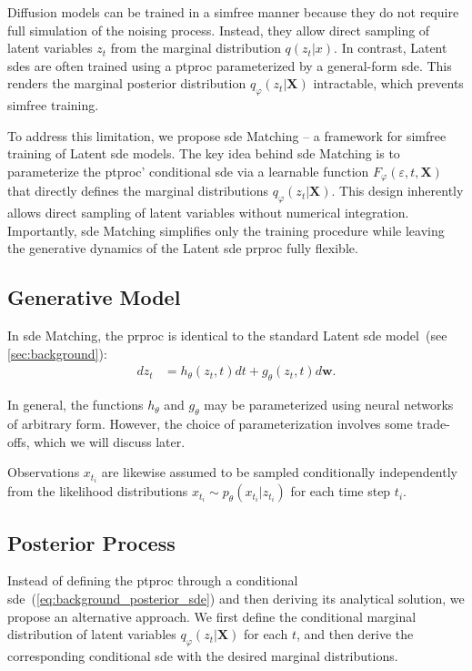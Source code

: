 \documentclass{article}
\def\X{\mathbf{X}}
\def\w{\mathbf{w}}
\def\e{\varepsilon}
\def\ph{\varphi}
\def\th{\theta}
\theoremstyle{plain}
\theoremstyle{definition}
\theoremstyle{remark}
\begin{document}
Diffusion models can be trained in a \gls{simfree} manner because they do not require full simulation of the noising process. Instead, they allow direct sampling of latent variables $z_t$ from the marginal distribution $q(z_t|x)$. In contrast, Latent \glspl{sde} are often trained using a  \gls{ptproc} parameterized by a general-form \gls{sde}. This renders the marginal posterior distribution $q_\ph(z_t|\X)$ intractable, which prevents \gls{simfree} training.


To address this limitation, we propose \gls{sde} Matching -- a framework for \gls{simfree} training of Latent \gls{sde} models. The key idea behind \gls{sde} Matching is to parameterize the \gls{ptproc}' conditional \gls{sde} via a learnable function $F_\ph(\e, t, \X)$ that directly defines the marginal distributions $q_\ph(z_t|\X)$. This design inherently allows direct sampling of latent variables without numerical integration. Importantly, \gls{sde} Matching simplifies only the training procedure while leaving the generative dynamics of the Latent \gls{sde} \gls{prproc} fully flexible. 


\subsection{Generative Model}


In \gls{sde} Matching, the \gls{prproc} is identical to the standard Latent \gls{sde} model~(see \cref{sec:background}):
\begin{align}
    d z_t &= h_\th(z_t, t) d t + g_\th(z_t, t) d \w.
    \label{eq:prior_sde}
\end{align}


In general, the functions $h_\th$ and $g_\th$ may be parameterized using neural networks of arbitrary form. However, the choice of parameterization involves some trade-offs, which we will discuss later.

Observations $x_{t_i}$ are likewise assumed to be sampled conditionally independently from the likelihood distributions ${x_{t_i} \sim p_\th(x_{t_i}|z_{t_i})}$ for each time step $t_i$.

\subsection{Posterior Process}
\label{sec:posterior_process}


Instead of defining the \gls{ptproc} through a conditional \gls{sde}~(\cref{eq:background_posterior_sde}) and then deriving its analytical solution, we propose an alternative approach. We first define the conditional marginal distribution of latent variables $q_\ph(z_t|\X)$ for each $t$, and then derive the corresponding conditional \gls{sde} with the desired marginal distributions.
\end{document}
